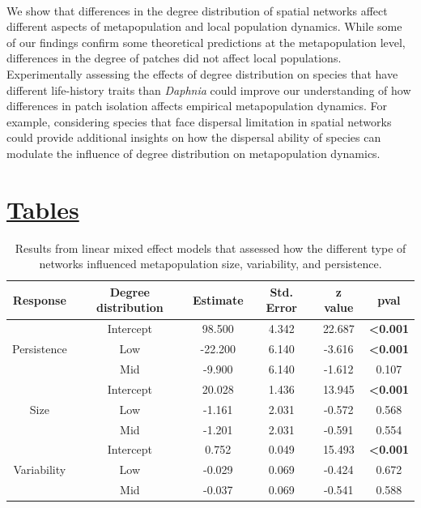 \paragraph*{}
We show that differences in the degree distribution of spatial networks affect different aspects of metapopulation and local population dynamics. While some of our findings confirm some theoretical predictions at the metapopulation level, differences in the degree of patches did not affect local populations. Experimentally assessing the effects of degree distribution on species that have different life-history traits than \textit{Daphnia} could improve our understanding of how differences in patch isolation affects empirical metapopulation dynamics. For example, considering species that face dispersal limitation in spatial networks could provide additional insights on how the dispersal ability of species can modulate the influence of degree distribution on metapopulation dynamics. 



\section*{\textbf{\underline{Tables}}}
\begin{table}[H]
\centering
\caption[Metapopulation linear mixed effect model]{Results from linear mixed effect models that assessed how the different type of networks influenced metapopulation size, variability, and persistence.}
\begin{tabular}{cccccc}
  \hline
 Response & Degree distribution & Estimate & Std. Error & z value & pval \\ 
  \hline
  &Intercept & 98.500 & 4.342 & 22.687 & \textbf{<0.001} \\ 
  Persistence &Low & -22.200 & 6.140 & -3.616 & \textbf{<0.001} \\ 
  &Mid & -9.900 & 6.140 & -1.612 & 0.107 \\ \hline
  &Intercept & 20.028 & 1.436 & 13.945 & \textbf{<0.001} \\ 
  Size &Low & -1.161 & 2.031 & -0.572 & 0.568 \\ 
  &Mid & -1.201 & 2.031 & -0.591 & 0.554 \\ \hline
  &Intercept & 0.752 & 0.049 & 15.493 & \textbf{<0.001} \\ 
  Variability&Low & -0.029 & 0.069 & -0.424 & 0.672 \\ 
  &Mid & -0.037 & 0.069 & -0.541 & 0.588 \\ 
   \hline
\end{tabular}
\label{tab:lmm_meta}
\end{table}



